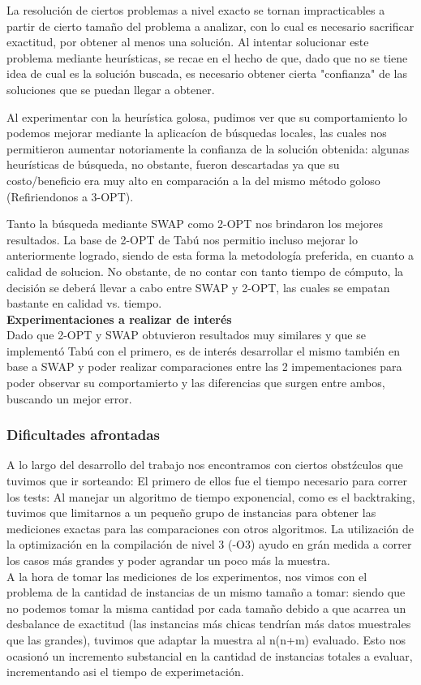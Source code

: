 La resolución de ciertos problemas a nivel exacto se tornan impracticables a partir de cierto tamaño del problema a analizar, con lo cual es necesario sacrificar exactitud, por obtener al menos una solución. Al intentar solucionar este problema mediante heurísticas, se recae en el hecho de que, dado que no se tiene idea de cual es la solución buscada, es necesario obtener cierta "confianza" de las soluciones que se puedan llegar a obtener.

Al experimentar con la heurística golosa, pudimos ver que su comportamiento lo podemos mejorar mediante la aplicacíon de búsquedas locales, las cuales nos permitieron aumentar notoriamente la confianza de la solución obtenida: algunas heurísticas de búsqueda, no obstante, fueron descartadas ya que  su costo/beneficio era muy alto en comparación a la del mismo método goloso (Refiriendonos a 3-OPT). 

Tanto la búsqueda mediante SWAP como 2-OPT nos brindaron los mejores resultados. La base de 2-OPT de Tabú nos permitio incluso mejorar lo anteriormente logrado, siendo de esta forma la metodología preferida, en cuanto a calidad de solucion. No obstante, de no contar con tanto tiempo de cómputo, la decisi\'on se deberá llevar a cabo entre SWAP y 2-OPT, las cuales se empatan bastante en calidad vs. tiempo.\\

\textbf{Experimentaciones a realizar de interés}\\
Dado que 2-OPT y SWAP obtuvieron resultados muy similares y que se implementó Tabú con el primero, es de interés desarrollar el mismo también en base a SWAP y poder realizar comparaciones entre las 2 impementaciones para poder observar su comportamierto y las diferencias que surgen entre ambos, buscando un mejor error.


\subsubsection{Dificultades afrontadas}

A lo largo del desarrollo del trabajo nos encontramos con ciertos obstźculos que tuvimos que ir sorteando:
El primero de ellos fue el tiempo necesario para correr los tests: Al manejar un algoritmo de tiempo exponencial, como es el backtraking, tuvimos que limitarnos a un pequeño grupo de instancias para obtener las mediciones exactas para las comparaciones con otros algoritmos. La utilización de la optimización en la compilación de nivel 3 (-O3) ayudo en grán medida a correr los casos más grandes y poder agrandar un poco más la muestra.\\
A la hora de tomar las mediciones de los experimentos, nos vimos con el problema de la cantidad de instancias de un mismo tamaño a tomar: siendo que no podemos tomar la misma cantidad por cada tamaño debido a que acarrea un desbalance de exactitud (las instancias más chicas tendrían más datos muestrales que las grandes), tuvimos que adaptar la muestra al n(n+m) evaluado. Esto nos ocasionó un incremento substancial en la cantidad de instancias totales a evaluar, incrementando asi el tiempo de experimetación.

